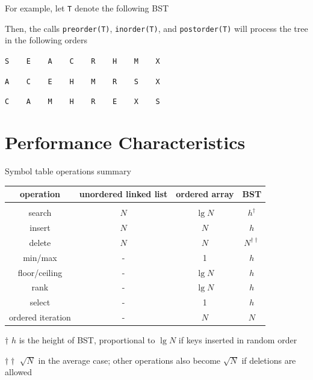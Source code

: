 \documentclass[8pt,a4paper,compress]{beamer}
\begin{document}
\begin{frame}[fragile]
\pause

For example, let \lstinline{T} denote the following BST
\begin{center}
\end{center}

\pause
\bigskip

Then, the calls \lstinline{preorder(T)}, \lstinline{inorder(T)}, and \lstinline{postorder(T)} will process the tree in the following orders

\begin{center}
\lstinline{S    E    A    C    R    H    M    X}

\bigskip

\lstinline{A    C    E    H    M    R    S    X}

\bigskip

\lstinline{C    A    M    H    R    E    X    S}
\end{center}
\end{frame}

\section{Performance Characteristics}
\begin{frame}[fragile]
\pause

Symbol table operations summary
\begin{center}
\begin{tabular}{cccc}
operation & unordered linked list & ordered array & BST \\ \hline \\
search & $N$ & $\lg N$ & $h^\dagger$ \\
insert & $N$ & $N$ & $h$ \\
delete & $N$ & $N$ & $N^{\dagger\dagger}$ \\
min/max & - & 1 & $h$ \\
floor/ceiling & - & $\lg N$ & $h$\\
rank & - & $\lg N$ & $h$ \\
select & - & 1 & $h$ \\
ordered iteration & - & $N$ & $N$ 
\end{tabular} 

\bigskip

\tiny $\dagger$ $h$ is the height of BST, proportional to $\lg N$ if keys inserted in random order

$\dagger\dagger$ $\sqrt{N}$ in the average case; other operations also become $\sqrt{N}$ if deletions are allowed
\end{center}
\end{frame}
\end{document}

